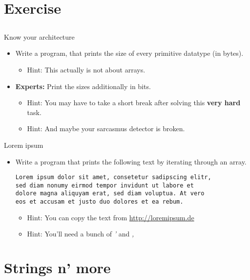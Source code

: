 \section{Exercise}
\subsection{}
\begin{frame}{Know your architecture}
	\begin{itemize}
		\item Write a program, that prints the size of every primitive datatype (in bytes).
		\begin{itemize}
			\item<2-> Hint: This actually is not about arrays.
		\end{itemize}
		\item \textbf{Experts:} Print the sizes additionally in bits.
		\begin{itemize}
			\item<3-> Hint: You may have to take a short break after solving this \textbf{very hard} task.
			\item<4-> Hint: And maybe your sarcasmus detector is broken.
		\end{itemize}
	\end{itemize}
\end{frame}
\begin{frame}[fragile]{Lorem ipsum}
	\begin{itemize}
		\item Write a program that prints the following text by iterating through an array.
		\begin{lstlisting}[numbers=none]
Lorem ipsum dolor sit amet, consetetur sadipscing elitr,
sed diam nonumy eirmod tempor invidunt ut labore et
dolore magna aliquyam erat, sed diam voluptua. At vero
eos et accusam et justo duo dolores et ea rebum.
\end{lstlisting}
		\begin{itemize}
			\item<2-> Hint: You can copy the text from \url{http://loremipsum.de}
			\item<3-> Hint: You'll need a bunch of \textit{'} and \textit{,}
		\end{itemize}
	\end{itemize}
\end{frame}
\section{Strings n' more}
